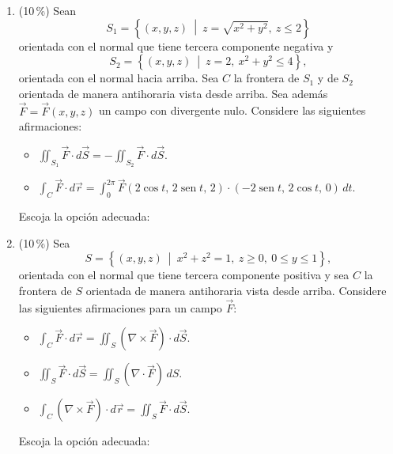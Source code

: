 \documentclass[11pt]{article}
\begin{document}
\begin{enumerate}
\item{} (10\,\%) Sean
\[
S_1 = \left\{(x,y,z)\ \middle|\ z = \sqrt{x^2+y^2},\ z \leq 2\right\}
\]
orientada con el normal que tiene tercera componente negativa y
\[
S_2 = \left\{(x,y,z)\ \middle|\ z = 2,\ x^2+y^2 \leq 4\right\},
\]
orientada con el normal hacia arriba. Sea $C$ la frontera de $S_1$ y de $S_2$ orientada de manera antihoraria vista desde arriba. Sea además $\vec F = \vec F(x,y,z)$ un campo con divergente nulo. Considere las siguientes afirmaciones:
\begin{itemize}
\item[(A)] $\displaystyle \iint_{S_1} \vec F \cdot d\vec S = -\iint_{S_2} \vec F \cdot d\vec S$.
\item[(B)] $\displaystyle \int_C \vec F \cdot d\vec r = \int_0^{2\pi} \vec F(2\cos t,\, 2\operatorname{sen} t,\, 2)\cdot(-2\operatorname{sen} t,\, 2\cos t,\, 0)\,dt$.
\end{itemize}
Escoja la opción adecuada:

\item{} (10\,\%) Sea
\[
S = \left\{(x,y,z)\ \middle|\ x^2+z^2 = 1,\ z \geq 0,\ 0 \leq y \leq 1\right\},
\]
orientada con el normal que tiene tercera componente positiva y sea $C$ la frontera de $S$ orientada de manera antihoraria vista desde arriba. Considere las siguientes afirmaciones para un campo $\vec F$:
\begin{itemize}
\item[(A)] $\displaystyle \int_C \vec F \cdot d\vec r = \iint_S (\nabla \times \vec F)\cdot d\vec S$.
\item[(B)] $\displaystyle \iint_S \vec F \cdot d\vec S = \iint_S (\nabla \cdot \vec F)\,dS$.
\item[(C)] $\displaystyle \int_C (\nabla \times \vec F)\cdot d\vec r = \iint_S \vec F \cdot d\vec S$.
\end{itemize}
Escoja la opción adecuada:


\end{enumerate}
\end{document}

